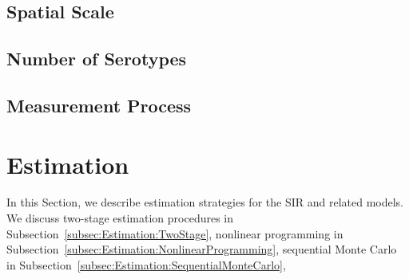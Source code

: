 \documentclass[fleqn]{article}\usepackage[]{graphicx}\usepackage[]{color}
\begin{document}
\subsection{Spatial Scale}
\label{subsec:ModelFormulation:SpatialScale}


\subsection{Number of Serotypes}
\label{subsec:ModelFormulation:NumberOfSerotypes}


\subsection{Measurement Process}
\label{subsec:ModelFormulation:MeasurementProcess}


\section{Estimation}
\label{sec:Estimation}

In this Section, we describe estimation strategies for the SIR and related models.  We discuss two-stage estimation procedures in Subsection~\ref{subsec:Estimation:TwoStage}, nonlinear programming in Subsection~\ref{subsec:Estimation:NonlinearProgramming}, sequential Monte Carlo in Subsection~\ref{subsec:Estimation:SequentialMonteCarlo}, 
\end{document}
